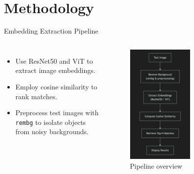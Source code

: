 \documentclass{beamer}
\begin{document}
\section{Methodology}
\begin{frame}{Embedding Extraction Pipeline}
\begin{columns}
    \begin{itemize}
        \item Use ResNet50 and ViT to extract image embeddings.
        \item Employ cosine similarity to rank matches.
        \item Preprocess test images with \texttt{rembg} to isolate objects from noisy backgrounds.
    \end{itemize}
    \begin{figure}
        \includegraphics[width=0.6\textwidth]{assets/pipeline_overview.png}
        \caption{Pipeline overview}
    \end{figure}
\end{columns}
\end{frame}
\end{document}
